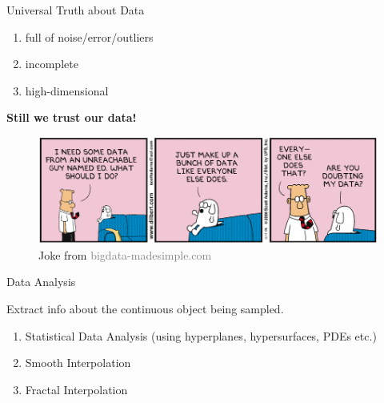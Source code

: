 \documentclass[10pt,sans-serif]{beamer}
\begin{document}
\begin{frame}{Universal Truth about Data}
  \begin{enumerate}
  \item full of noise/error/outliers
  \item incomplete
  \item high-dimensional
  \end{enumerate}

  \pause

  \vspace{12pt}
  \textbf{Still we trust our data!}
  \begin{figure}
    \centering
    \includegraphics[scale=0.35]{trust-the-data}
    \caption{Joke from \textcolor{gray}{bigdata-madesimple.com}}
  \end{figure}
\end{frame}

\begin{frame}{Data Analysis}

  \begin{block}{}
    Extract info about the continuous object being sampled.
  \end{block}

  \pause
  
  \begin{block}{}
    \begin{enumerate}
    \item Statistical Data Analysis (using hyperplanes, hypersurfaces, PDEs
      etc.)
    \item Smooth Interpolation
    \item Fractal Interpolation
    \end{enumerate}
  \end{block}
\end{frame}
\end{document}
